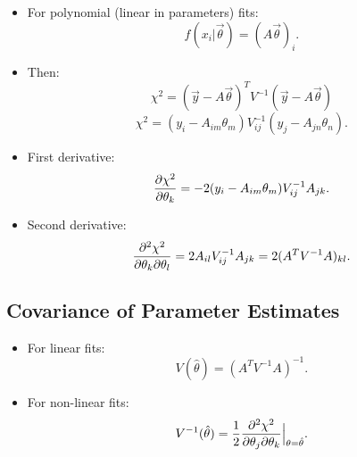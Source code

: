 \begin{itemize}
      \item For polynomial (linear in parameters) fits:
            \[
                  f(x_i|\vec{\theta}) = (A \vec{\theta})_i .
            \]
      \item Then:
            \[
                  \chi^2 = (\vec{y} - A \vec{\theta})^T V^{-1} (\vec{y} - A \vec{\theta})
            \]
            \[
                  \chi^2 = (y_i - A_{im} \theta_m) V_{ij}^{-1} (y_j - A_{jn} \theta_n) .
            \]
      \item First derivative:
            \[
                  \pdv{\chi^2}{\theta_k} = -2 (y_i - A_{im} \theta_m) V_{ij}^{-1} A_{jk} .
            \]
      \item Second derivative:
            \[
                  \pdv{\chi^2}{\theta_k}{\theta_l} = 2 A_{il} V_{ij}^{-1} A_{jk} = 2 (A^T V^{-1} A)_{kl} .
            \]
\end{itemize}

\subsection{Covariance of Parameter Estimates}

\begin{itemize}
      \item For linear fits:
            \[
                  V(\hat{\theta}) = (A^T V^{-1} A)^{-1} .
            \]
      \item For non-linear fits:
            \[
                  V^{-1}(\hat{\theta}) = \frac{1}{2} \pdv[2]{\chi^2}{\theta_j}{\theta_k} \Big|_{\theta = \hat{\theta}} .
            \]
\end{itemize}
